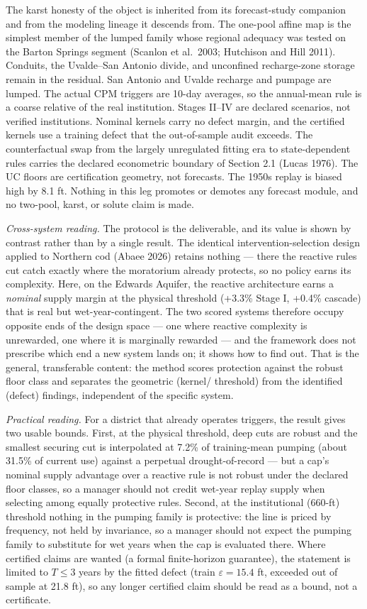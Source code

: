 The karst honesty of the object is inherited from its forecast-study
companion and from the modeling lineage it descends from. The one-pool
affine map is the simplest member of the lumped family whose regional
adequacy was tested on the Barton Springs segment (Scanlon et al.~2003;
Hutchison and Hill 2011). Conduits, the Uvalde--San Antonio divide, and
unconfined recharge-zone storage remain in the residual. San Antonio and
Uvalde recharge and pumpage are lumped. The actual CPM triggers are
10-day averages, so the annual-mean rule is a coarse relative of the
real institution. Stages II--IV are declared scenarios, not verified
institutions. Nominal kernels carry no defect margin, and the certified
kernels use a training defect that the out-of-sample audit exceeds. The
counterfactual swap from the largely unregulated fitting era to
state-dependent rules carries the declared econometric boundary of
Section 2.1 (Lucas 1976). The UC floors are certification geometry, not
forecasts. The 1950s replay is biased high by 8.1 ft. Nothing in this
leg promotes or demotes any forecast module, and no two-pool, karst, or
solute claim is made.

\emph{Cross-system reading.} The protocol is the deliverable, and its
value is shown by contrast rather than by a single result. The identical
intervention-selection design applied to Northern cod (Abaee 2026)
retains nothing --- there the reactive rules cut catch exactly where the
moratorium already protects, so no policy earns its complexity. Here, on
the Edwards Aquifer, the reactive architecture earns a \emph{nominal}
supply margin at the physical threshold (+3.3\% Stage I, +0.4\% cascade)
that is real but wet-year-contingent. The two scored systems therefore
occupy opposite ends of the design space --- one where reactive
complexity is unrewarded, one where it is marginally rewarded --- and the
framework does not prescribe which end a new system lands on; it shows
how to find out. That is the general, transferable content: the method
scores protection against the robust floor class and separates the
geometric (kernel/ threshold) from the identified (defect) findings,
independent of the specific system.

\emph{Practical reading.} For a district that already operates triggers,
the result gives two usable bounds. First, at the physical threshold,
deep cuts are robust and the smallest securing cut is interpolated at
7.2\% of training-mean pumping (about 31.5\% of current use) against a
perpetual drought-of-record --- but a cap's nominal supply advantage over
a reactive rule is not robust under the declared floor classes, so a
manager should not credit wet-year replay supply when selecting among
equally protective rules. Second, at the institutional (660-ft) threshold
nothing in the pumping family is protective: the line is priced by
frequency, not held by invariance, so a manager should not expect the
pumping family to substitute for wet years when the cap is evaluated
there. Where certified claims are wanted (a formal finite-horizon
guarantee), the statement is limited to $T \le 3$ years by the fitted
defect (train $\varepsilon = 15.4$ ft, exceeded out of sample at 21.8 ft),
so any longer certified claim should be read as a bound, not a
certificate.

